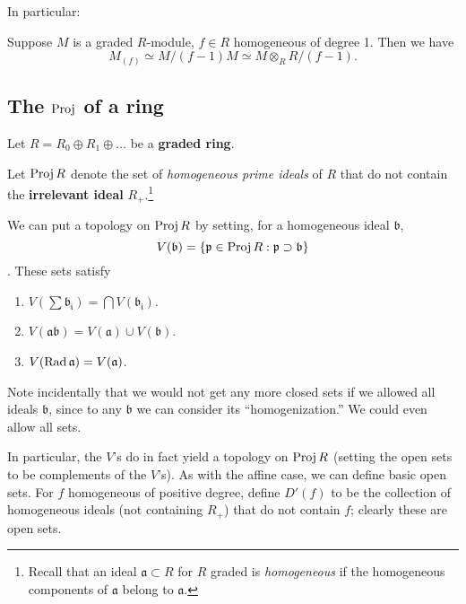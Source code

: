 In particular:
\begin{corollary} 
Suppose $M$ is a graded $R$-module, $f \in R$ homogeneous of degree 1. Then we
have
\[  M_{(f)} \simeq M/(f-1)M \simeq M\otimes_R R/(f-1).  \]
\end{corollary} 

\subsection{The $\operatorname{Proj}$ of a ring}
Let $R=R_0 \oplus R_1 \oplus \dots$ be a \textbf{graded ring}.

\begin{definition} 
Let $\operatorname{Proj} R$ denote the set of \emph{homogeneous prime ideals} of
$R$ that do not contain the \textbf{irrelevant ideal} $R_+$.\footnote{Recall
that an ideal $\mathfrak{a} \subset R$ for $R$ graded is
\emph{homogeneous} if the homogeneous components of $\mathfrak{a}$ belong to
$\mathfrak{a}$.}

\end{definition} 

We can put a topology on $\operatorname{Proj} R$ by setting, for a homogeneous ideal
$\mathfrak{b}$, $$V(\mathfrak{b}) = \{ \mathfrak{p} \in \operatorname{Proj} R:
\mathfrak{p} \supset \mathfrak{b}\}$$.  These sets satisfy
\begin{enumerate}
\item $V( \sum \mathfrak{b_i}) = \bigcap V(\mathfrak{b_i})$.
\item  $V( \mathfrak{a}\mathfrak{b}) = V(\mathfrak{a}) \cup V(\mathfrak{b})$.
\item  $V( \operatorname{Rad} \mathfrak{a}) = V(\mathfrak{a})$.
\end{enumerate}
Note incidentally that we would not get any more closed sets if we allowed all
ideals $\mathfrak{b}$, since to any $\mathfrak{b}$ we can consider its
``homogenization.''
We could even allow all sets.

In particular,  the $V$'s do in fact yield a topology on $\operatorname{Proj} R$ (setting
the open sets to be complements of the $V$'s).
As with the affine case, we can define basic open sets. For $f$
homogeneous of positive degree, define $D'(f)$ to be the
collection of homogeneous ideals (not containing $R_+$) that do not contain $f$;
clearly these are
open sets.

